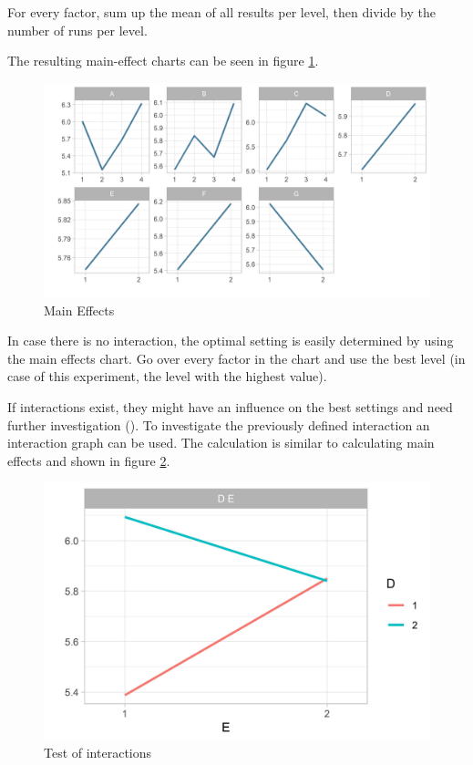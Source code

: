 For every factor, sum up the mean of all results per level, then divide by the number of runs per level.


The resulting main-effect charts can be seen in figure \ref{fig:hyperparam_tuning:main_effects}.
\begin{figure}[ht] 
	\label{fig:hyperparam_tuning:main_effects}
	\includegraphics[width=1\linewidth]{simulations/taguchi/plots/main_effects}
	\caption{Main Effects}
\end{figure}


In case there is no interaction, the optimal setting is easily determined by using the main effects chart. Go over every factor in the chart and use the best level (in case of this experiment, the level with the highest value). 

If interactions exist, they might have an influence on the best settings and need further investigation (\cite{yang_design_2009}). To investigate the previously defined interaction an interaction graph can be used. The calculation is similar to calculating main effects and shown in figure \ref{fig:hyperparam_tuning:test_of_interaction}.


\begin{figure}[ht] 
	\label{fig:hyperparam_tuning:test_of_interaction}
	\centering
	\includegraphics[width=0.4\linewidth]{simulations/taguchi/plots/test_of_interaction}
	\caption{Test of interactions}
\end{figure}

